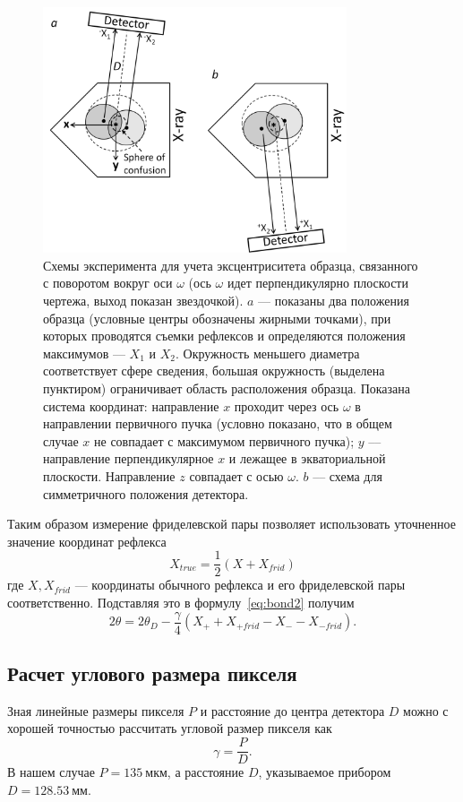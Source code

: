 \documentclass[a4paper,14pt]{extarticle}
\newcommand{\unit}[1]{ \ \text{#1}}
\begin{document}
\begin{figure}[ht!]
    \centering
    \includegraphics[width=0.8\textwidth]{eccentr.png}
    \caption{Схемы эксперимента для учета эксцентриситета образца, связанного с поворотом вокруг оси $\omega$ (ось $\omega$ идет перпендикулярно плоскости чертежа, выход показан звездочкой). $a$ --- показаны два положения образца (условные центры обозначены жирными точками), при которых проводятся съемки рефлексов и определяются положения максимумов –-- $X_1$ и $X_2$. Окружность меньшего диаметра соответствует сфере сведения, большая окружность (выделена пунктиром) ограничивает область расположения образца. Показана система координат: направление $x$ проходит через ось $\omega$ в направлении первичного пучка (условно показано, что в общем случае $x$ не совпадает с максимумом первичного пучка); $y$ --– направление перпендикулярное $x$ и лежащее в экваториальной плоскости. Направление $z$ совпадает с осью $\omega$. $b$ –-- схема для симметричного положения детектора.}
    \label{fig:eccentr}
\end{figure}

Таким образом измерение фриделевской пары позволяет использовать уточненное значение координат рефлекса
\[X_{true} = \frac{1}{2}(X + X_{frid})\]
где $X, X_{frid}$ --- координаты обычного рефлекса и его фриделевской пары соответственно.
Подставляя это в формулу~\ref{eq:bond2} получим
\begin{equation} \label{eq:bond4}
    2\theta = 2\theta_D - \frac{\gamma}{4} (X_{+} + X_{+frid} - X_{-} - X_{-frid}).
\end{equation}
\subsection{Расчет углового размера пикселя}
Зная линейные размеры пикселя $P$ и расстояние до центра детектора $D$ можно с хорошей точностью рассчитать угловой размер пикселя как
\begin{equation} \label{eq:gamma_simple}
    \gamma = \frac{P}{D}.
\end{equation}
В нашем случае $P = 135\unit{мкм}$, а расстояние $D$, указываемое прибором $D = 128.53\unit{мм}$.
\end{document}

